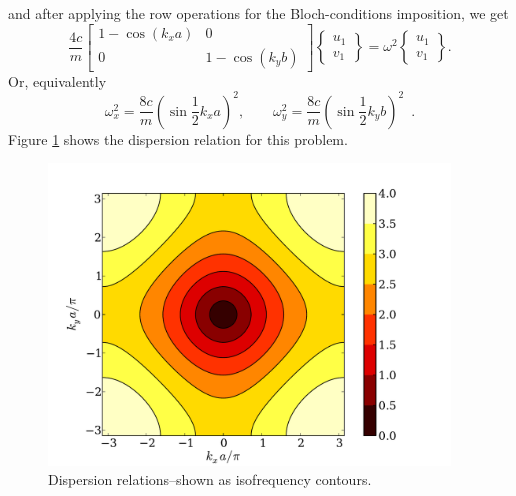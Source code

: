 \documentclass[12pt,letterpaper]{article}
\begin{document}
and after applying the row operations for the Bloch-conditions imposition, we get
\begin{equation}
\frac{4c}{m}\left[ \begin{array}{cc}
1 - \cos(k_x a) & 0 \\ 
0 & 1-\cos(k_y b)
\end{array}  \right] \left\lbrace \begin{array}{c}
u_1 \\ 
v_1 
\end{array}  \right\rbrace = \omega^2 \left\lbrace \begin{array}{c}
u_1 \\ 
v_1 
\end{array}  \right\rbrace .
\end{equation}
Or, equivalently
\begin{equation}
\omega_x^2 = \frac{8c}{m}\left( \sin \frac{1}{2}k_x a\right)^2,\qquad \omega_y^2 = \frac{8c}{m}\left( \sin \frac{1}{2}k_y b \right)^2 \enspace .
\end{equation}
Figure \ref{fig:square-disp} shows the dispersion relation for this problem.
\begin{figure}[h]
\centering
\includegraphics[height=8cm]{img/square-disp.pdf} 
\caption{Dispersion relations--shown as isofrequency contours.}\label{fig:square-disp}
\end{figure}
\end{document}

